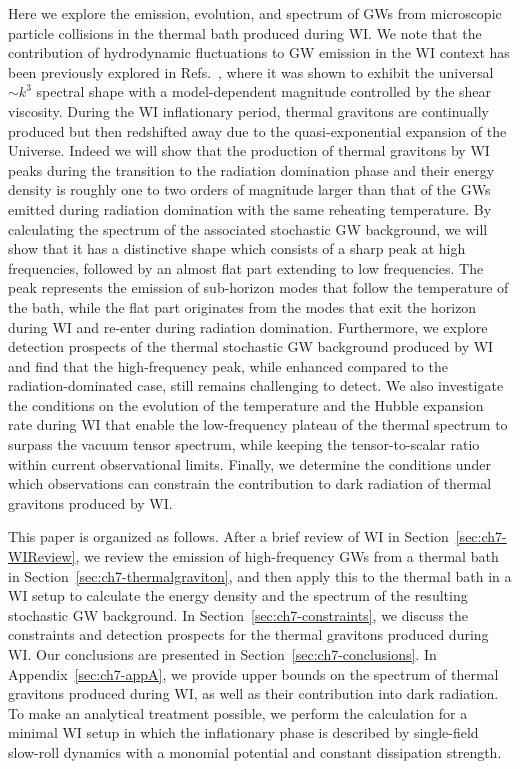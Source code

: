 Here we explore the emission, evolution, and spectrum of GWs from microscopic particle collisions in the thermal bath produced during WI. We note that the contribution of hydrodynamic fluctuations to GW emission in the WI context has been previously explored in Refs.~\cite{Qiu:2021ytc,Klose:2022rxh}, where it was shown to exhibit the universal $\sim k^3$ spectral shape with a model-dependent magnitude controlled by the shear viscosity. During the WI inflationary period, thermal gravitons are continually produced but then redshifted away due to the quasi-exponential expansion of the Universe.
Indeed we will show that the production of thermal gravitons by WI peaks during the transition to the radiation domination phase and their energy density is roughly one to two orders of magnitude larger than that of the  GWs emitted during radiation domination with the same reheating temperature. By calculating the spectrum of the associated stochastic GW background, we will show that it has a distinctive shape which consists of a sharp peak at high frequencies, followed by an almost flat part extending to low frequencies. The peak represents the emission of sub-horizon modes that follow the temperature of the bath, while the flat part  originates from the modes that exit the horizon during WI and re-enter during radiation domination. Furthermore, we explore detection prospects of the thermal stochastic GW background produced by WI and find that the high-frequency peak, while enhanced compared to the radiation-dominated case, still remains challenging to detect. We also investigate the conditions on the evolution of the temperature and the Hubble expansion rate during
WI that enable the low-frequency plateau of the thermal spectrum to surpass the vacuum tensor spectrum, while keeping the tensor-to-scalar ratio within current observational limits. Finally, we determine the conditions under which observations can constrain the contribution to dark radiation of thermal gravitons produced by WI.

This paper is organized as follows. After a brief review of WI in Section~\ref{sec:ch7-WIReview}, we  review the emission of high-frequency GWs from a thermal bath in Section~\ref{sec:ch7-thermalgraviton}, and then apply this to the thermal bath in a WI setup to calculate the energy density and the spectrum of the resulting stochastic GW background. In Section~\ref{sec:ch7-constraints}, we discuss the constraints and detection prospects for the
thermal gravitons produced during WI. Our conclusions are presented in Section~\ref{sec:ch7-conclusions}. In Appendix~\ref{sec:ch7-appA}, we provide upper bounds on the spectrum of thermal gravitons produced during WI, as well as their contribution into dark radiation. To make an analytical treatment possible, we perform the calculation for a minimal WI setup in which the inflationary phase is described by single-field slow-roll dynamics with a monomial potential and constant dissipation strength.

